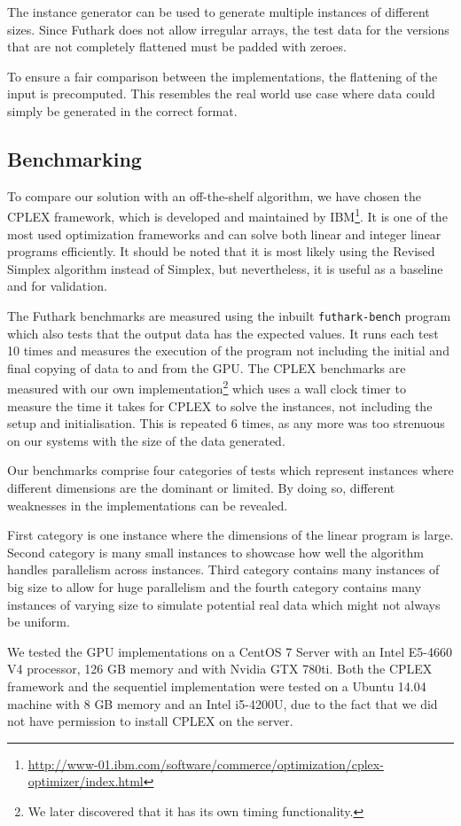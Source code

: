 \newpar The instance generator can be used to generate multiple instances of different sizes. Since Futhark does not allow irregular arrays, the test data for the versions that are not completely flattened must be padded with zeroes.

To ensure a fair comparison between the implementations, the flattening of the input is precomputed. This resembles the real world use case where data could simply be generated in the correct format.

\subsection{Benchmarking}
To compare our solution with an off-the-shelf algorithm, we have chosen the CPLEX framework, which is developed and maintained by IBM\footnote{\url{http://www-01.ibm.com/software/commerce/optimization/cplex-optimizer/index.html}}. It is one of the most used optimization frameworks and can solve both linear and integer linear programs efficiently. It should be noted that it is most likely using the Revised Simplex algorithm instead of Simplex, but nevertheless, it is useful as a baseline and for validation.

\newpar The Futhark benchmarks are measured using the inbuilt \texttt{futhark-bench} program which also tests that the output data has the expected values. It runs each test 10 times and measures the execution of the program not including the initial and final copying of data to and from the GPU. The CPLEX benchmarks are measured with our own implementation\footnote{We later discovered that it has its own timing functionality.} which uses a wall clock timer to measure the time it takes for CPLEX to solve the instances, not including the setup and initialisation. This is repeated 6 times, as any more was too strenuous on our systems with the size of the data generated.

\newpar Our benchmarks comprise four categories of tests which represent instances where different dimensions are the dominant or limited. By doing so, different weaknesses in the implementations can be revealed.

First category is one instance where the dimensions of the linear program is large. Second category is many small instances to showcase how well the algorithm handles parallelism across instances. Third category contains many instances of big size to allow for huge parallelism and the fourth category contains many instances of varying size to simulate potential real data which might not always be uniform.

\newpar We tested the GPU implementations on a CentOS 7 Server with an Intel E5-4660 V4 processor, 126 GB memory and with Nvidia GTX 780ti. Both the CPLEX framework and the sequentiel
implementation were tested on a Ubuntu 14.04 machine with 8 GB memory and an Intel i5-4200U, due to the fact that we did not have permission to install CPLEX on the server.
